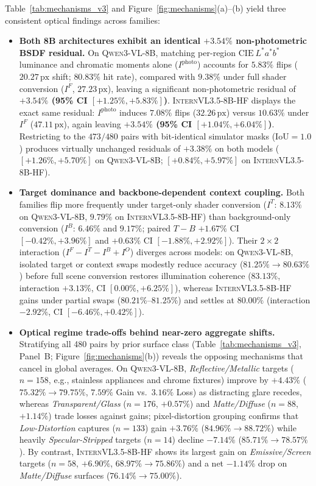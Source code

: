 Table~\ref{tab:mechanisms_v3} and Figure~\ref{fig:mechanisms}(a)--(b) yield three consistent optical findings across families:
\begin{itemize}
    \item \textbf{Both 8B architectures exhibit an identical $+3.54\%$ non-photometric BSDF residual.} On \textsc{Qwen3-VL-8B}, matching per-region $\mathrm{CIE}~L^*a^*b^*$ luminance and chromatic moments alone ($I^{\text{photo}}$) accounts for $5.83\%$ flips ($20.27\,\mathrm{px}$ shift; $80.83\%$ hit rate), compared with $9.38\%$ under full shader conversion ($I^F$, $27.23\,\mathrm{px}$), leaving a significant non-photometric residual of \textbf{$+3.54\%$ (95\% CI $[+1.25\%, +5.83\%]$)}. \textsc{InternVL3.5-8B-HF} displays the exact same residual: $I^{\text{photo}}$ induces $7.08\%$ flips ($32.26\,\mathrm{px}$) versus $10.63\%$ under $I^F$ ($47.11\,\mathrm{px}$), again leaving \textbf{$+3.54\%$ (95\% CI $[+1.04\%, +6.04\%]$)}. Restricting to the $473/480$ pairs with bit-identical simulator masks ($\mathrm{IoU}=1.0$) produces virtually unchanged residuals of $+3.38\%$ on both models ($[+1.26\%, +5.70\%]$ on \textsc{Qwen3-VL-8B}; $[+0.84\%, +5.97\%]$ on \textsc{InternVL3.5-8B-HF}).
    \item \textbf{Target dominance and backbone-dependent context coupling.} Both families flip more frequently under target-only shader conversion ($I^T$: $8.13\%$ on \textsc{Qwen3-VL-8B}, $9.79\%$ on \textsc{InternVL3.5-8B-HF}) than background-only conversion ($I^B$: $6.46\%$ and $9.17\%$; paired $T{-}B$ $+1.67\%$ CI $[-0.42\%, +3.96\%]$ and $+0.63\%$ CI $[-1.88\%, +2.92\%]$). Their $2\times 2$ interaction ($I^F - I^T - I^B + I^O$) diverges across models: on \textsc{Qwen3-VL-8B}, isolated target or context swaps modestly reduce accuracy ($81.25\% \to 80.63\%$) before full scene conversion restores illumination coherence ($83.13\%$, interaction $+3.13\%$, CI $[0.00\%, +6.25\%]$), whereas \textsc{InternVL3.5-8B-HF} gains under partial swaps ($80.21\%\text{--}81.25\%$) and settles at $80.00\%$ (interaction $-2.92\%$, CI $[-6.46\%, +0.42\%]$).
    \item \textbf{Optical regime trade-offs behind near-zero aggregate shifts.} Stratifying all 480 pairs by prior surface class (Table~\ref{tab:mechanisms_v3}, Panel~B; Figure~\ref{fig:mechanisms}(b)) reveals the opposing mechanisms that cancel in global averages. On \textsc{Qwen3-VL-8B}, \emph{Reflective/Metallic} targets ($n{=}158$, e.g., stainless appliances and chrome fixtures) improve by $+4.43\%$ ($75.32\% \to 79.75\%$, $7.59\%$ Gain vs.\ $3.16\%$ Loss) as distracting glare recedes, whereas \emph{Transparent/Glass} ($n{=}176$, $+0.57\%$) and \emph{Matte/Diffuse} ($n{=}88$, $+1.14\%$) trade losses against gains; pixel-distortion grouping confirms that \emph{Low-Distortion} captures ($n{=}133$) gain $+3.76\%$ ($84.96\% \to 88.72\%$) while heavily \emph{Specular-Stripped} targets ($n{=}14$) decline $-7.14\%$ ($85.71\% \to 78.57\%$). By contrast, \textsc{InternVL3.5-8B-HF} shows its largest gain on \emph{Emissive/Screen} targets ($n{=}58$, $+6.90\%$, $68.97\% \to 75.86\%$) and a net $-1.14\%$ drop on \emph{Matte/Diffuse} surfaces ($76.14\% \to 75.00\%$).
\end{itemize}


